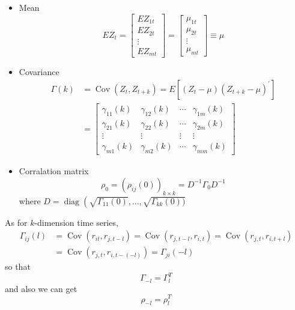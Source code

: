 \documentclass{article}
\begin{document}
\begin{itemize}
	\item Mean
	\begin{equation*}
	E Z_{t}=\left[ \begin{array}{c}{E Z_{1 t}} \\ {E Z_{2 t}} \\ {\vdots} \\ {E Z_{m t}}\end{array}\right]=\left[ \begin{array}{c}{\mu_{1 t}} \\ {\mu_{2 t}} \\ {\vdots} \\ {\mu_{m t}}\end{array}\right] \equiv \mu
	\end{equation*}
	\item Covariance
	\begin{equation*}
	\begin{aligned}
	\Gamma(k)&=\operatorname{Cov}\left(Z_{t}, Z_{t+k}\right)=E\left[\left(Z_{t}-\mu\right)\left(Z_{t+k}-\mu\right)^{\prime}\right]\\
	&=\left[ \begin{array}{cccc}{\gamma_{11}(k)} & {\gamma_{12}(k)} & {\cdots} & {\gamma_{1 m}(k)} \\ {\gamma_{21}(k)} & {\gamma_{22}(k)} & {\cdots} & {\gamma_{2 m}(k)} \\ {\vdots} & {\vdots} & {\vdots} & {\vdots} \\ {\gamma_{m 1}(k)} & {\gamma_{m 2}(k)} & {\cdots} & {\gamma_{m m}(k)}\end{array}\right]
	\end{aligned}
	\end{equation*}
	\item Corralation matrix
	\begin{equation*}
	\rho_{0}=\left(\rho_{i j}(0)\right)_{k \times k}=D^{-1} \Gamma_{0} D^{-1}
	\end{equation*}
	where $D=\operatorname{diag}\left(\sqrt{\Gamma_{11}(0)}, \ldots, \sqrt{\Gamma_{k k}(0) )}\right.$
\end{itemize}

\noindent As for $k$-dimension time series,
\begin{equation*}
\begin{aligned} \Gamma_{i j}(l) &=\operatorname{Cov}\left(r_{i t}, r_{j, t-l}\right)=\operatorname{Cov}\left(r_{j, t-l}, r_{i, t}\right)=\operatorname{Cov}\left(r_{j, t}, r_{i, t+l}\right) \\ &=\operatorname{Cov}\left(r_{j, t}, r_{i, t-(-l)}\right)=\Gamma_{j i}(-l) \end{aligned}
\end{equation*}
so that
\begin{equation*}
\Gamma_{-l}=\Gamma_{l}^{T}
\end{equation*}
and also we can get
\begin{equation*}
\rho_{-l}=\rho_{l}^{T}
\end{equation*}
\end{document}
